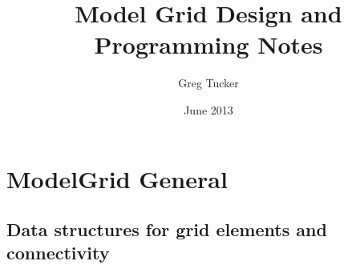 \documentclass[12pt]{amsart}
\title{Model Grid Design and Programming Notes}
\author{Greg Tucker}
\date{June 2013} %
\begin{document}
\maketitle

\section{ModelGrid General}

\subsection{Data structures for grid elements and connectivity}

\begin{table}[htbp]
   \centering
   \begin{tabular}{@{} lccc @{}} %
      \toprule
      

\end{tabular}
\end{table}
\end{document}
